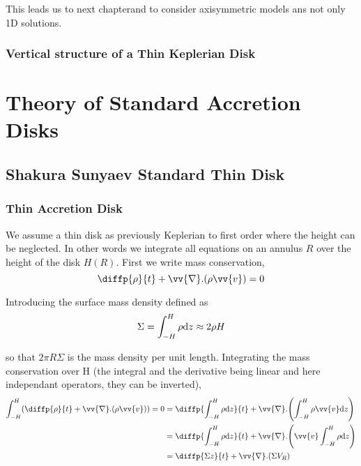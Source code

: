 \documentclass[10pt,a4paper,english,draft]{article}
\let\originalleft\left
\let\originalright\right
\renewcommand{\left}{\mathopen{}\mathclose\bgroup\originalleft}
\renewcommand{\right}{\aftergroup\egroup\originalright}
\begin{document}
This leads us to next chapterand to consider axisymmetric models ans not only 1D solutions.



 
\subsubsection{Vertical structure of a Thin Keplerian Disk}

\section{Theory of Standard Accretion Disks}

\subsection{Shakura Sunyaev Standard Thin Disk}

\subsubsection{Thin Accretion Disk}


We assume a thin disk as previously Keplerian to first order where the height
can be neglected. In other words we integrate all equations on an annulus $R$
over the height of the disk $H(R)$. First we write mass conservation,
\begin{equation*}
    \diffp{\rho}{t} + \vv{\nabla}.(\rho \vv{v}) = 0
\end{equation*}

Introducing the surface mass density defined as
\begin{equation*}
    \Sigma = \int_{-H}^H \rho \mathrm{d}{z} \approx 2 \rho H
\end{equation*}

so that $2 \pi R \Sigma$ is the mass density per unit length. Integrating the
mass conservation over H (the integral and the derivative being linear and here
independant operators, they can be inverted),
\begin{align*}
    \int_{-H}^H \left( \diffp{\rho}{t} + \vv{\nabla}.(\rho \vv{v}) \right) = 0 %
    &= \diffp{\int_{-H}^H \rho \d{z}}{t} + \vv{\nabla}.\left( \int_{-H}^H \rho \vv{v} \d{z} \right) \\
    &= \diffp{\int_{-H}^H \rho \d{z}}{t} + \vv{\nabla}.\left( \vv{v} \int_{-H}^H \rho \d{z} \right) \\
    &= \diffp{\Sigma z}{t} + \vv{\nabla}.(\Sigma V_R)
\end{align*}
\end{document}
